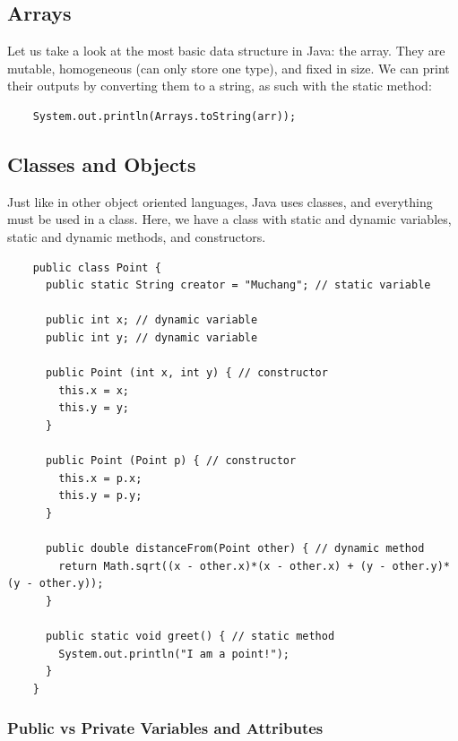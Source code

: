 \documentclass{article}
\begin{document}
  \subsection{Arrays}

    Let us take a look at the most basic data structure in Java: the array. They are mutable, homogeneous (can only store one type), and fixed in size. We can print their outputs by converting them to a string, as such with the static method: 
    \begin{lstlisting}
    System.out.println(Arrays.toString(arr)); 
    \end{lstlisting}

  \subsection{Classes and Objects}

    Just like in other object oriented languages, Java uses classes, and everything must be used in a class. Here, we have a class with static and dynamic variables, static and dynamic methods, and constructors. 
    \begin{lstlisting}
    public class Point {
      public static String creator = "Muchang"; // static variable 

      public int x; // dynamic variable
      public int y; // dynamic variable 

      public Point (int x, int y) { // constructor 
        this.x = x; 
        this.y = y; 
      }

      public Point (Point p) { // constructor
        this.x = p.x; 
        this.y = p.y; 
      }

      public double distanceFrom(Point other) { // dynamic method 
        return Math.sqrt((x - other.x)*(x - other.x) + (y - other.y)*(y - other.y)); 
      }
      
      public static void greet() { // static method 
        System.out.println("I am a point!"); 
      }
    }
    \end{lstlisting}

    \subsubsection{Public vs Private Variables and Attributes}
\end{document}
